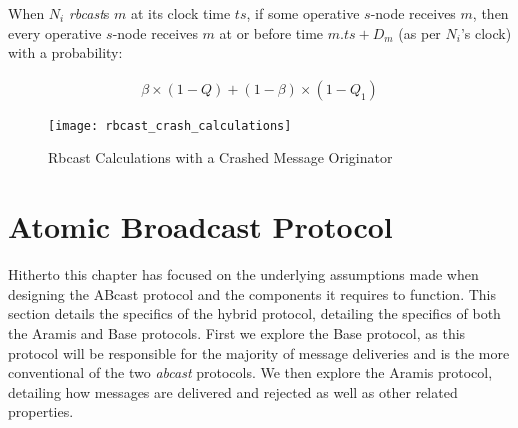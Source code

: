 When $N_i$ \emph{rbcast}s $m$ at its clock time $ts$, if some operative $s$-node receives $m$, then every operative $s$-node receives $m$ at or before time $m.ts+D_m$ (as per $N_i$'s clock) with a probability:

         \begin{equation*}
            \begin{aligned}
                \beta\times(1-Q)+(1-\beta)\times(1-Q_1)
            \end{aligned}
        \end{equation*}

        \begin{sidewaysfigure}
            \vspace*{-1cm}
            \strictpagecheck
            \checkoddpage
            \ifoddpage
                \hspace*{-2.5cm}
            \fi           
            \centering
                \texttt{[image: rbcast\_crash\_calculations]}
            \caption[Rbcast Calculation Diagram with a Crashed Message Originator]{Rbcast Calculations with a Crashed Message Originator}
            \label{fig:rbcast_crash_calc}
       \end{sidewaysfigure}

                
\clearpage
\section{Atomic Broadcast Protocol}\label{sec:ABcast}
Hitherto this chapter has focused on the underlying assumptions made when designing the \textsf{ABcast} protocol and the components it requires to function.  This section details the specifics of the hybrid protocol, detailing the specifics of both the \textsf{Aramis} and \textsf{Base} protocols.  First we explore the \textsf{Base} protocol, as this protocol will be responsible for the majority of message deliveries and is the more conventional of the two \emph{abcast} protocols.  We then explore the \textsf{Aramis} protocol, detailing how messages are delivered and rejected as well as other related properties.  

